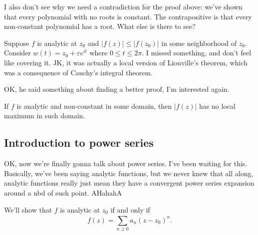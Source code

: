 I also don't see why we need a contradiction for the proof above: we've shown that every polynomial with no roots is constant. The contrapositive is that every non-constant polynomial has a root. What else is there to see?

\orbreak
Suppose $f$ is analytic at $z_0$ and $|f(z)|\leq |f(z_0)|$ in some neighborhood of $z_0$. Consider $w(t)=z_0+\varepsilon e^{it}$ where $0\leq t \leq 2\pi$. I missed something, and don't feel like covering it. JK, it was actually a local version of Liouville's theorem, which was a consequence of Cauchy's integral theorem.

OK, he said something about finding a better proof, I'm interested again.

\begin{theorem}
    If $f$ is analytic and non-constant in some domain, then $|f(z)|$ has no local maximum in such domain.
\end{theorem}

\subsection{Introduction to power series}

OK, now we're finally gonna talk about power series. I've been waiting for this. Basically, we've been saying analytic functions, but we never knew that all along, analytic functions really just mean they have a convergent power series expansion around a nbd of such point. AHahahA

We'll show that $f$ is analytic at $z_0$ if and only if \[
    f(z)=\sum_{n\geq 0}^{} a_n (z-z_0)^n .
\] 
